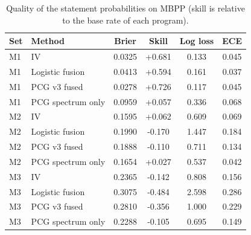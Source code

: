 \begin{table}[t]
\centering
\caption{Quality of the statement probabilities on MBPP (skill is relative to the base rate of each program).}
\label{tab:cal}
\begin{tabular}{llcccc}
\toprule
Set & Method & Brier & Skill & Log loss & ECE \\
\midrule
M1 & IV & 0.0325 & +0.681 & 0.133 & 0.045 \\
M1 & Logistic fusion & 0.0413 & +0.594 & 0.161 & 0.037 \\
M1 & PCG v3 fused & 0.0278 & +0.726 & 0.117 & 0.045 \\
M1 & PCG spectrum only & 0.0959 & +0.057 & 0.336 & 0.068 \\
M2 & IV & 0.1595 & +0.062 & 0.609 & 0.069 \\
M2 & Logistic fusion & 0.1990 & -0.170 & 1.447 & 0.184 \\
M2 & PCG v3 fused & 0.1888 & -0.110 & 0.711 & 0.134 \\
M2 & PCG spectrum only & 0.1654 & +0.027 & 0.537 & 0.042 \\
M3 & IV & 0.2365 & -0.142 & 0.808 & 0.156 \\
M3 & Logistic fusion & 0.3075 & -0.484 & 2.598 & 0.286 \\
M3 & PCG v3 fused & 0.2810 & -0.356 & 1.000 & 0.229 \\
M3 & PCG spectrum only & 0.2288 & -0.105 & 0.695 & 0.149 \\
\bottomrule
\end{tabular}
\end{table}
